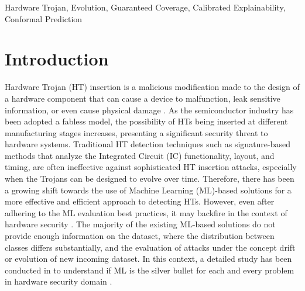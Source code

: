 \documentclass[9pt,conference]{IEEEtran}
\begin{document}
\begin{IEEEkeywords}
Hardware Trojan, Evolution, Guaranteed Coverage, Calibrated Explainability, Conformal Prediction
\end{IEEEkeywords}


\section{Introduction}
\label{Intro}
Hardware Trojan (HT) insertion is a malicious modification made to the design of a hardware component that can cause a device to malfunction, leak sensitive information, or even cause physical damage \cite{francq2015introduction}. As the semiconductor industry has been adopted a fabless model, the possibility of HTs being inserted at different manufacturing stages increases, presenting a significant security threat to hardware systems. Traditional HT detection techniques such as signature-based methods \cite{gbade2014signature} that analyze the Integrated Circuit (IC) functionality, layout, and timing, are often ineffective against sophisticated HT insertion attacks, especially when the Trojans can be designed to evolve over time. Therefore, there has been a growing shift towards the use of Machine Learning (ML)-based solutions for a more effective and efficient approach to detecting HTs. However, even after adhering to the ML evaluation best practices, it may backfire in the context of hardware security \cite{285613}. The majority of the existing ML-based solutions do not provide enough information on the dataset, where the distribution between classes differs substantially, and the evaluation of attacks under the concept drift or evolution of new incoming dataset. In this context, a detailed study has been conducted in \cite{quiring2022and} to understand if ML is the silver bullet for each and every problem in hardware security domain \cite{liu2021two}.
\end{document}
